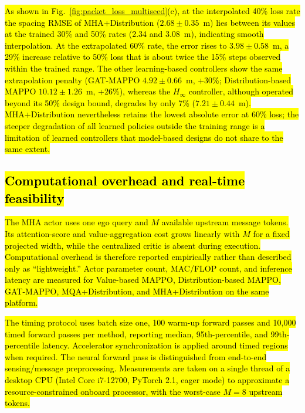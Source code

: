 \documentclass{ieeeaccess}
\begin{document}
\hl{As shown in Fig.~\ref{fig:packet_loss_multiseed}(c), at the interpolated 40\% loss rate the spacing RMSE of MHA+Distribution ($2.68\pm0.35$~m) lies between its values at the trained 30\% and 50\% rates (2.34 and 3.08~m), indicating smooth interpolation. At the extrapolated 60\% rate, the error rises to $3.98\pm0.58$~m, a 29\% increase relative to 50\% loss that is about twice the 15\% steps observed within the trained range. The other learning-based controllers show the same extrapolation penalty (GAT-MAPPO $4.92\pm0.66$~m, +30\%; Distribution-based MAPPO $10.12\pm1.26$~m, +26\%), whereas the $H_\infty$ controller, although operated beyond its 50\% design bound, degrades by only 7\% ($7.21\pm0.44$~m). MHA+Distribution nevertheless retains the lowest absolute error at 60\% loss; the steeper degradation of all learned policies outside the training range is a limitation of learned controllers that model-based designs do not share to the same extent.} %

\subsection{\hl{Computational overhead and real-time feasibility}}
\label{sec:computation}

\hl{The MHA actor uses one ego query and $M$ available upstream message tokens. Its attention-score and value-aggregation cost grows linearly with $M$ for a fixed projected width, while the centralized critic is absent during execution. Computational overhead is therefore reported empirically rather than described only as ``lightweight.'' Actor parameter count, MAC/FLOP count, and inference latency are measured for Value-based MAPPO, Distribution-based MAPPO, GAT-MAPPO, MQA+Distribution, and MHA+Distribution on the same platform.}

\hl{The timing protocol uses batch size one, 100 warm-up forward passes and 10,000 timed forward passes per method, reporting median, 95th-percentile, and 99th-percentile latency. Accelerator synchronization is applied around timed regions when required. The neural forward pass is distinguished from end-to-end sensing/message preprocessing. Measurements are taken on a single thread of a desktop CPU (Intel Core i7-12700, PyTorch 2.1, eager mode) to approximate a resource-constrained onboard processor, with the worst-case $M=8$ upstream tokens.} %
\end{document}
